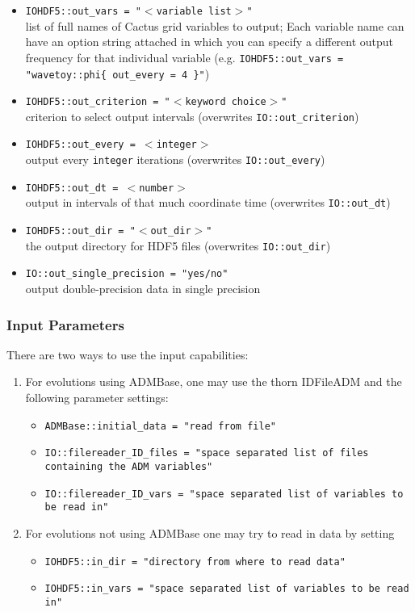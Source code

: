 \begin{itemize}
  \item {\tt IOHDF5::out\_vars = "$<$variable list$>$"}\\
        list of full names of Cactus grid variables to output;
        Each variable name can have an option string attached in which you
        can specify a different output frequency for that individual variable
        (e.g. {\tt IOHDF5::out\_vars = "wavetoy::phi\{ out\_every = 4 \}"})
  \item {\tt IOHDF5::out\_criterion = "$<$keyword choice$>$"}\\
        criterion to select output intervals (overwrites {\tt IO::out\_criterion})
  \item {\tt IOHDF5::out\_every = $<$integer$>$}\\
        output every {\tt integer} iterations (overwrites {\tt IO::out\_every})
  \item {\tt IOHDF5::out\_dt = $<$number$>$}\\
        output in intervals of that much coordinate time (overwrites {\tt IO::out\_dt})
  \item {\tt IOHDF5::out\_dir = "$<$out\_dir$>$"}\\
        the output directory for HDF5 files (overwrites {\tt IO::out\_dir})
  \item {\tt IO::out\_single\_precision = "yes/no"}\\
        output double-precision data in single precision
\end{itemize}

\subsubsection{Input Parameters}

There are two ways to use the input capabilities:

\begin{enumerate}
  \item For evolutions using ADMBase, one may use the thorn IDFileADM and the following parameter settings:
    \begin{itemize}
      \item {\tt ADMBase::initial\_data  = "read from file"}
      \item {\tt IO::filereader\_ID\_files = "space separated list of files containing the ADM variables"}
      \item {\tt IO::filereader\_ID\_vars = "space separated list of variables to be read in"}
    \end{itemize}
  \item For evolutions not using ADMBase one may try to read in data by setting
    \begin{itemize}
      \item {\tt IOHDF5::in\_dir = "directory from where to read data"}
      \item {\tt IOHDF5::in\_vars = "space separated list of variables to be read in"}
    \end{itemize}
\end{enumerate}


